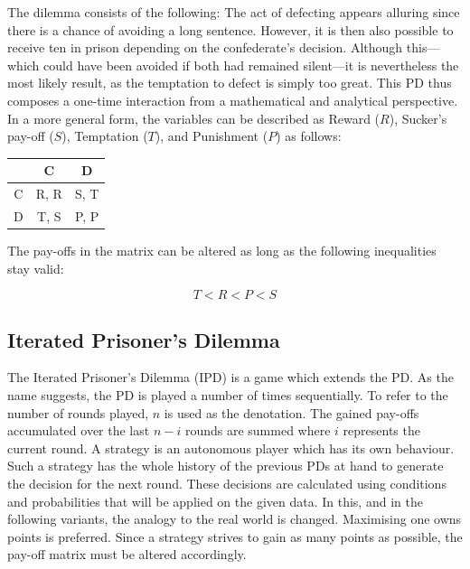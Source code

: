 \documentclass[11pt]{article}
\begin{document}
\noindent
The dilemma consists of the following:
The act of defecting appears alluring since there is a chance of avoiding a long sentence.
However, it is then also possible to receive ten in prison depending on the confederate's decision.
Although this---which could have been avoided if both had remained silent---it is nevertheless the most likely result, as the temptation to defect is simply too great.
This PD thus composes a one-time interaction from a mathematical and analytical perspective. 
In a more general form, the variables can be described as Reward ($R$), Sucker's pay-off ($S$), Temptation ($T$), and Punishment ($P$) as follows:

\begin{center}
\begin{tabular}{ c|c|c }
   & C & D \\ 
   \hline
 C & R, R & S, T\\  
   \hline
 D & T, S & P, P
\end{tabular}
\end{center}

\noindent The pay-offs in the matrix can be altered as long as the following inequalities stay valid:

\begin{equation}
	T < R < P < S
	\label{eq:TRPS}
\end{equation}

\subsection{Iterated Prisoner's Dilemma}
		
The Iterated Prisoner's Dilemma (IPD) is a game which extends the PD. 
As the name suggests, the PD is played a number of times sequentially. 
To refer to the number of rounds played, $n$ is used as the denotation. 
The gained pay-offs accumulated over the last $n-i$ rounds are summed where $i$ represents the current round.
A strategy is an autonomous player which has its own behaviour.
Such a strategy has the whole history of the previous PDs at hand to generate the decision for the next round.
These decisions are calculated using conditions and probabilities that will be applied on the given data.
In this, and in the following variants, the analogy to the real world is changed.
Maximising one owns points is preferred.
Since a strategy strives to gain as many points as possible, the pay-off matrix must be altered accordingly.\\
\end{document}
